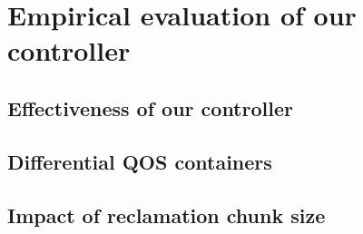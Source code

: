   
  \section{Empirical evaluation of our controller}
  
    \subsection{Effectiveness of our controller}
    
    \subsection{Differential QOS containers}
    
    \subsection{Impact of reclamation chunk size}